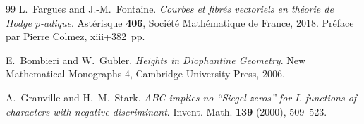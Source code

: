 \documentclass[11pt,a4paper]{article}
\theoremstyle{definition}
\theoremstyle{plain}
\theoremstyle{definition}
\begin{document}
\begin{thebibliography}{99}
L.~Fargues and J.-M.~Fontaine.
\newblock \emph{Courbes et fibr\'es vectoriels en th\'eorie de Hodge $p$-adique}.
\newblock Ast\'erisque \textbf{406}, Soci\'et\'e Math\'ematique de France, 2018.
Pr\'eface par Pierre Colmez, xiii+382~pp.

E.~Bombieri and W.~Gubler.
\newblock \emph{Heights in Diophantine Geometry}.
\newblock New Mathematical Monographs 4, Cambridge University Press, 2006.

A.~Granville and H.~M.~Stark.
\newblock \emph{ABC implies no ``Siegel zeros'' for $L$-functions of characters
with negative discriminant}.
\newblock Invent. Math. \textbf{139} (2000), 509--523.

\end{thebibliography}
\end{document}
